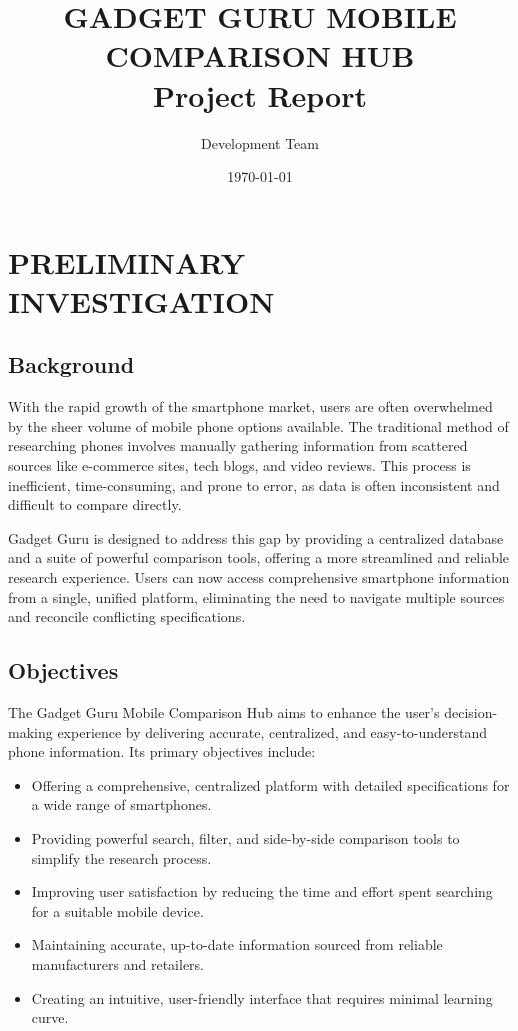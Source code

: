 \documentclass[12pt]{article}
\title{\textbf{GADGET GURU MOBILE COMPARISON HUB} \\ \Large Project Report}
\author{Development Team}
\date{\today}
\begin{document}
\maketitle
\newpage

\tableofcontents
\newpage

\section{PRELIMINARY INVESTIGATION}

\subsection{Background}
With the rapid growth of the smartphone market, users are often overwhelmed by the sheer volume of mobile phone options available. The traditional method of researching phones involves manually gathering information from scattered sources like e-commerce sites, tech blogs, and video reviews. This process is inefficient, time-consuming, and prone to error, as data is often inconsistent and difficult to compare directly. 

Gadget Guru is designed to address this gap by providing a centralized database and a suite of powerful comparison tools, offering a more streamlined and reliable research experience. Users can now access comprehensive smartphone information from a single, unified platform, eliminating the need to navigate multiple sources and reconcile conflicting specifications.

\subsection{Objectives}
The Gadget Guru Mobile Comparison Hub aims to enhance the user's decision-making experience by delivering accurate, centralized, and easy-to-understand phone information. Its primary objectives include:

\begin{itemize}
    \item Offering a comprehensive, centralized platform with detailed specifications for a wide range of smartphones.
    \item Providing powerful search, filter, and side-by-side comparison tools to simplify the research process.
    \item Improving user satisfaction by reducing the time and effort spent searching for a suitable mobile device.
    \item Maintaining accurate, up-to-date information sourced from reliable manufacturers and retailers.
    \item Creating an intuitive, user-friendly interface that requires minimal learning curve.
\end{itemize}
\end{document}
